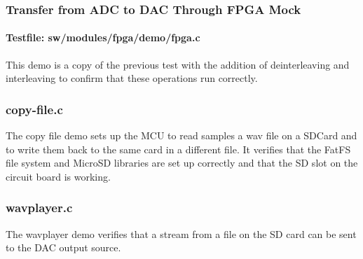 \subsubsection{Transfer from ADC to DAC Through FPGA Mock}
\paragraph{Testfile: sw/modules/fpga/demo/fpga.c}

This demo is a copy of the previous test with the addition of deinterleaving and
interleaving to confirm that these operations run correctly.

\subsubsection{copy-file.c}
The copy file demo sets up the MCU to read samples a wav file on a SDCard and to write
them back to the same card in a different file. It verifies that the FatFS file system
and MicroSD libraries are set up correctly and that the SD slot on the circuit board
is working.

\subsubsection{wavplayer.c}
The wavplayer demo verifies that a stream from a file on the SD card can be sent to the
DAC output source. 


